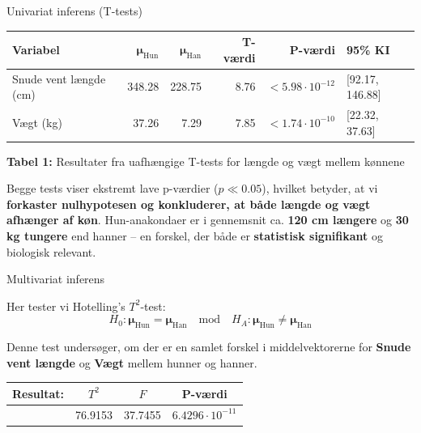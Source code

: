 \documentclass[final]{beamer}
\newlength{\colwidth}
\begin{document}
\begin{frame}[t]
\begin{columns}[t]
\begin{column}{\colwidth}
\begin{block}{Univariat inferens (T-tests)}
\begin{table}
  \begin{tabular}{l r r r r l}
  \toprule
  \textbf{Variabel} & \textbf{$\boldsymbol{\mu}_{\mathrm{Hun}}$}
 & \textbf{$\boldsymbol{\mu}_{\mathrm{Han}}$} & \textbf{T-værdi} & \textbf{P-værdi} & \textbf{95\% KI} \\
  \midrule
  Snude vent længde (cm) & 348.28 & 228.75 & 8.76 & $< 5.98\cdot 10^{-12}$ & [92.17, 146.88] \\
  Vægt (kg) & 37.26 & 7.29 & 7.85 & $< 1.74\cdot 10^{-10}$ & [22.32, 37.63] \\
  \bottomrule
  \end{tabular}

    
    
    
      \vspace{1em}
	\textbf{\textcolor{junglegreen}{Tabel 1:}} Resultater fra uafhængige T-tests for længde og vægt mellem kønnene
    
    
    
            
  \end{table}
  
   \vspace{1em}
  
   Begge tests viser ekstremt lave p-værdier ($p \ll 0.05$), hvilket betyder, at vi \textbf{forkaster nulhypotesen og konkluderer, at både længde og vægt afhænger af køn}.
  Hun-anakondaer er i gennemsnit ca. \textbf{120 cm længere} og \textbf{30 kg tungere} end hanner – en forskel, der både er \textbf{statistisk signifikant} og biologisk relevant.

  \end{block}
  
  	\begin{block}{Multivariat inferens}
\justifying

Her tester vi Hotelling’s $T^2$-test:
\[
H_0: \boldsymbol{\mu}_{\text{Hun}} = \boldsymbol{\mu}_{\text{Han}} 
\quad \text{mod} \quad 
H_A: \boldsymbol{\mu}_{\text{Hun}} \ne \boldsymbol{\mu}_{\text{Han}}
\]

Denne test undersøger, om der er en samlet forskel i middelvektorerne for \textbf{Snude vent længde} og \textbf{Vægt} mellem hunner og hanner.

\begin{center}
\begin{tabular}{lccc}
\textbf{Resultat:} & $T^2$ & $F$ & \textbf{P-værdi} \\
\midrule
& 76.9153 & 37.7455 & $6.4296 \cdot 10^{-11}$ \\
\end{tabular}
\end{center}


\end{block}
\end{column}
\end{columns}
\end{frame}
\end{document}
